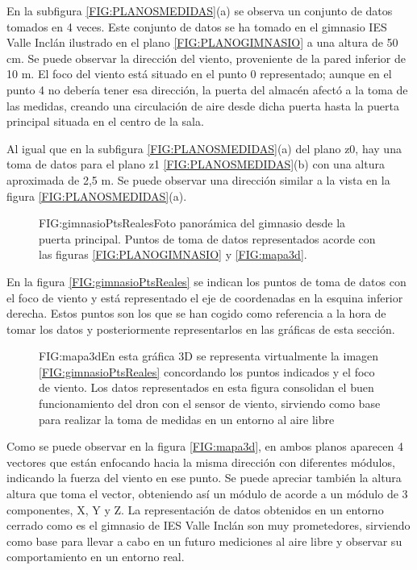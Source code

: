 En la subfigura \ref{FIG:PLANOSMEDIDAS}(a) se observa un conjunto de datos tomados en 4 veces. Este conjunto de datos se ha tomado en el gimnasio IES Valle Inclán ilustrado en el plano \ref{FIG:PLANOGIMNASIO} a una altura de 50 cm. Se puede observar la dirección del viento, proveniente de la pared inferior de 10 m. El foco del viento está situado en el punto 0 representado; aunque en el punto 4 no debería tener esa dirección, la puerta del almacén afectó a la toma de las medidas, creando una circulación de aire desde dicha puerta hasta la puerta principal situada en el centro de la sala.

Al igual que en la subfigura \ref{FIG:PLANOSMEDIDAS}(a) del plano z0, hay una toma de datos para el plano z1 \ref{FIG:PLANOSMEDIDAS}(b) con una altura aproximada de 2,5 m. Se puede observar una dirección similar a la vista en la figura \ref{FIG:PLANOSMEDIDAS}(a).


\begin{figure}[Representación toma de puntos en gimnasio]{FIG:gimnasioPtsReales}{Foto panorámica del gimnasio desde la puerta principal. Puntos de toma de datos representados acorde con las figuras \ref{FIG:PLANOGIMNASIO} y \ref{FIG:mapa3d}.}
\end{figure}
En la figura \ref{FIG:gimnasioPtsReales} se indican los puntos de toma de datos con el foco de viento y está representado el eje de coordenadas en la esquina inferior derecha. Estos puntos son los que se han cogido como referencia a la hora de tomar los datos y posteriormente representarlos en las gráficas de esta sección.

\begin{figure}[Mapa de viento 3D]{FIG:mapa3d}{En esta gráfica 3D se representa virtualmente la imagen \ref{FIG:gimnasioPtsReales} concordando los puntos indicados y el foco de viento. Los datos representados en esta figura consolidan el buen funcionamiento del dron con el sensor de viento, sirviendo como base para realizar la toma de medidas en un entorno al aire libre}
\end{figure}
Como se puede observar en la figura \ref{FIG:mapa3d}, en ambos planos aparecen 4 vectores que están enfocando hacia la misma dirección con diferentes módulos, indicando la fuerza del viento en ese punto. Se puede apreciar también la altura altura que toma el vector, obteniendo así un módulo de acorde a un módulo de 3 componentes, X, Y y Z. La representación de datos obtenidos en un entorno cerrado como es el gimnasio de IES Valle Inclán son muy prometedores, sirviendo como base para llevar a cabo en un futuro mediciones al aire libre y observar su comportamiento en un entorno real.